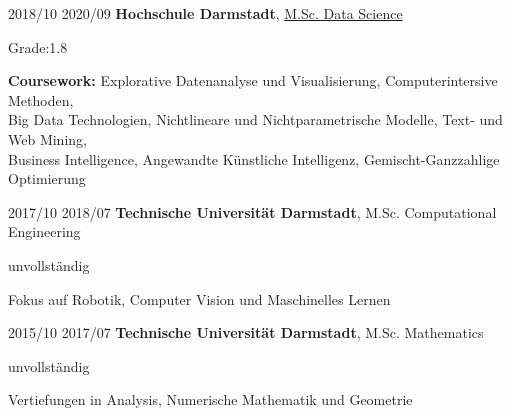 \documentclass{maxcv}
\begin{document}
\begin{twocolentry}{2018/10 \dash{} 2020/09}
    \textbf{Hochschule Darmstadt}, \href{https://h-da.de/en/studies/study-programmes/study-programmes/natural-science-and-mathematics/data-science}{M.Sc. Data Science}
\end{twocolentry}
\vspace{0.10 cm}
\begin{onecolentry}
    \begin{highlights}
        \item Grade:\@ 1.8
        \item \textbf{Coursework:} Explorative Datenanalyse und Visualisierung, Computerintersive Methoden,\\
        Big Data Technologien, Nichtlineare und Nichtparametrische Modelle, Text- und Web Mining,\\
        Business Intelligence, Angewandte Künstliche Intelligenz, Gemischt-Ganzzahlige Optimierung
    \end{highlights}
\end{onecolentry}

\vspace{0.2 cm}

\begin{twocolentry}{2017/10 \dash{} 2018/07}
    \textbf{Technische Universität Darmstadt}, M.Sc. Computational Engineering
\end{twocolentry}
\vspace{0.10 cm}
\begin{onecolentry}
    \begin{highlights}
        \item unvollständig
        \item Fokus auf Robotik, Computer Vision und Maschinelles Lernen
    \end{highlights}
\end{onecolentry}

\vspace{0.2 cm}

\begin{twocolentry}{2015/10 \dash{} 2017/07}
    \textbf{Technische Universität Darmstadt}, M.Sc. Mathematics
\end{twocolentry}
\vspace{0.10 cm}
\begin{onecolentry}
    \begin{highlights}
        \item unvollständig
        \item Vertiefungen in Analysis, Numerische Mathematik und Geometrie
    \end{highlights}
\end{onecolentry}
\end{document}
